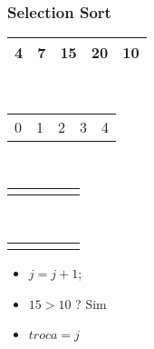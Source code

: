 \documentclass{beamer}
\begin{document}
\begin{frame}
    \frametitle{Selection Sort}
    \begin{center}
        \begin{table}
            \begin{tabular}{| p{0.25cm} | p{0.25cm} | p{0.25cm} | p{0.25cm} | p{0.25cm} |}
                \hline
                4 & 7 & 15 & 20 & 10 \\ \hline
            \end{tabular} \\
            \begin{tabular}{p{0.25cm} p{0.25cm} p{0.25cm} p{0.25cm} p{0.25cm}}
                0 & 1 & 2 & 3 & 4
            \end{tabular} \\
            \begin{tabular}{p{0.25cm} p{0.25cm} p{0.25cm} p{0.25cm} p{0.25cm}}
                 & & \color{blue}{$\uparrow$} & & \color{red}{$\uparrow$}
            \end{tabular} \\
            \begin{tabular}{p{0.25cm} p{0.25cm} p{0.25cm} p{0.25cm} p{0.25cm}}
                 & & \color{blue}{i} & & \color{red}{j}
            \end{tabular}
        \end{table}
	\end{center}
    \color{green}{$troca = 2$}
    \begin{itemize}[<+->]
        \item $j = j + 1$;
        \item $15 > 10$ ? Sim
        \item $troca = j$
    \end{itemize}
\end{frame}
\end{document}
